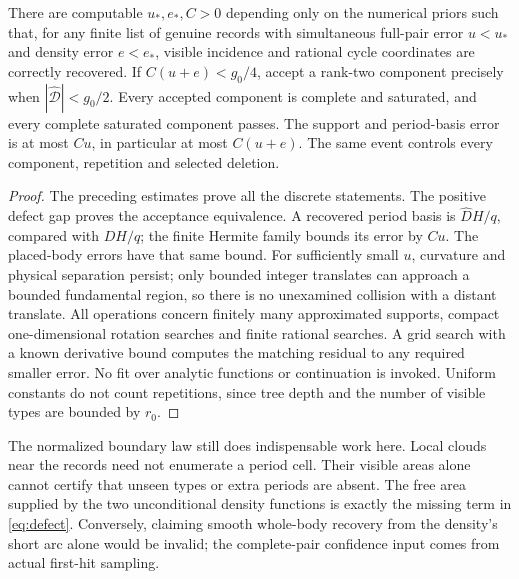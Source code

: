 \begin{theorem}\label{thm:certificate}
There are computable $u_*,e_*,C>0$ depending only on the numerical priors
such that, for any finite list of genuine records with simultaneous
full-pair error $u<u_*$ and density error $e<e_*$, visible incidence and
rational cycle coordinates are correctly recovered. If
$C(u+e)<g_0/4$, accept a rank-two component precisely when
$|\widehat{\mathcal D}|<g_0/2$. Every accepted component is complete and
saturated, and every complete saturated component passes. The support
and period-basis error is at most $Cu$, in particular at most $C(u+e)$.
The same event controls every component, repetition and selected deletion.
\end{theorem}
\begin{proof}
The preceding estimates prove all the discrete statements. The positive
defect gap proves the acceptance equivalence. A recovered period basis
is $\widehat D H/q$, compared with $DH/q$; the finite Hermite family
bounds its error by $Cu$. The placed-body errors have that same bound.
For sufficiently small $u$, curvature and physical separation persist;
only bounded integer translates can approach a bounded fundamental
region, so there is no unexamined collision with a distant translate.
All operations concern finitely many approximated supports, compact
one-dimensional rotation searches and finite rational searches. A grid
search with a known derivative bound computes the matching residual to
any required smaller error. No fit over analytic functions or continuation
is invoked. Uniform constants do not count repetitions, since tree depth
and the number of visible types are bounded by $r_0$.
\end{proof}

The normalized boundary law still does indispensable work here. Local
clouds near the records need not enumerate a period cell. Their visible
areas alone cannot certify that unseen types or extra periods are absent.
The free area supplied by the two unconditional density functions is
exactly the missing term in \eqref{eq:defect}. Conversely, claiming smooth
whole-body recovery from the density's short arc alone would be invalid;
the complete-pair confidence input comes from actual first-hit sampling.
